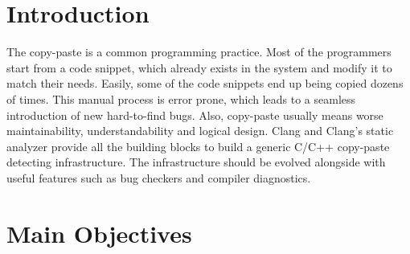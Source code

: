 \documentclass[a0,portrait]{a0poster}
\begin{document}
\vspace{1cm} %


\begin{multicols}{2} %


\color{SaddleBrown} %

\section*{Introduction}

The copy-paste is a common programming practice. Most of the programmers start from a code snippet, which already exists in the system and modify it to match their needs. Easily, some of the code snippets end up being copied dozens of times. This manual process is error prone, which leads to a seamless introduction of new hard-to-find bugs. Also, copy-paste usually means worse maintainability, understandability and logical design. Clang and Clang's static analyzer provide all the building blocks to build a generic C/C++ copy-paste detecting infrastructure. The infrastructure should be evolved alongside with useful features such as bug checkers and compiler diagnostics.


\color{Black} %

\section*{Main Objectives}


\end{multicols}
\end{document}
